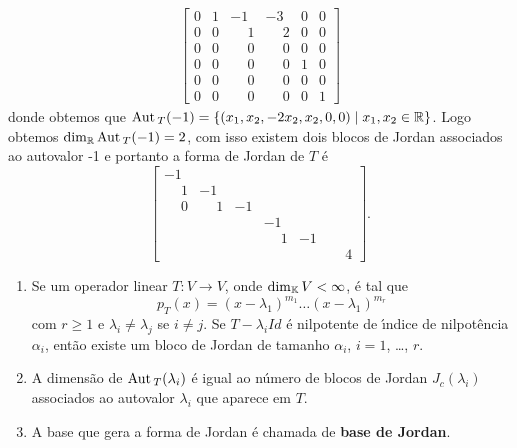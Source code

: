 \begin{exemplo}
\begin{enumerate}[label={\arabic*})]
\begin{solucao}
\begin{align*}
\begin{bmatrix}
  					0 & 1 & -1 & -3 & 0 & 0\\
					0 & 0 & \phantom{-}1 & \phantom{-}2 & 0 & 0\\
					0 & 0 & \phantom{-}0 & \phantom{-}0 & 0 & 0\\
					0 & 0 & \phantom{-}0 & \phantom{-}0 & 1 & 0\\
					0 & 0 & \phantom{-}0 & \phantom{-}0 & 0 & 0\\
					0 & 0 & \phantom{-}0 & \phantom{-}0 & 0 & 1
     			\end{bmatrix}
     		\end{align*}
     		donde obtemos que ${\rm Aut\,}_T(-1) = \{(x_1, x_2, -2x_2, x_2, 0, 0) \mid x_1, x_2 \in \mathbb{R}\}$. Logo obtemos $\dim_{\mathbb{R}} {\rm Aut\,}_T(-1) = 2$, com isso existem dois blocos de Jordan associados ao autovalor -1 e portanto a forma de Jordan de $T$ \'e
     		\[
     			\begin{bmatrix}
					-1\\
					\phantom{-}1 & -1\\
					\phantom{-}0 & \phantom{-}1 & -1\\
					& & & -1 & \\
					& & & \phantom{-}1 & -1\\
					& & & & & \phantom{-}4
				\end{bmatrix}.
     		\]
		\end{solucao}
	\end{enumerate}
\end{exemplo}

\begin{observacao}
	\begin{enumerate}[label={\arabic*})]
		\item  Se um operador linear $T : V \to V$, onde $\dim_{\mathbb{K}} V < \infty$, \'e tal que
			\[
				p_T(x) = (x - \lambda_1)^{m_1}\dots(x - \lambda_1)^{m_r}
			\]
		com $r \ge 1$ e $\lambda_i \ne \lambda_j$ se $i \ne j$. Se $T - \lambda_i Id$ \'e nilpotente de {\'\i}ndice de nilpot\^encia $\alpha_i$, ent\~ao existe um bloco de Jordan de tamanho $\alpha_i$, $i = 1$, \dots, $r$.
		\item A dimens\~ao de ${\rm Aut\,}_T(\lambda_i)$ \'e igual ao n\'umero de blocos de Jordan $J_c(\lambda_i)$ associados ao autovalor $\lambda_i$ que aparece em $T$.
		\item A base que gera a forma de Jordan \'e chamada de \textbf{base de Jordan}.
	\end{enumerate}
\end{observacao}

